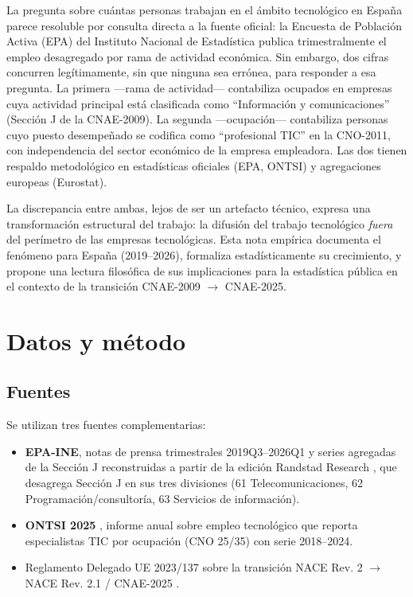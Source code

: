 \documentclass[11pt,a4paper]{article}
\begin{document}
La pregunta sobre cuántas personas trabajan en el ámbito tecnológico en España
parece resoluble por consulta directa a la fuente oficial: la Encuesta de
Población Activa (EPA) del Instituto Nacional de Estadística publica
trimestralmente el empleo desagregado por rama de actividad económica. Sin
embargo, dos cifras concurren legítimamente, sin que ninguna sea errónea, para
responder a esa pregunta. La primera ---rama de actividad--- contabiliza
ocupados en empresas cuya actividad principal está clasificada como
``Información y comunicaciones'' (Sección J de la CNAE-2009). La segunda
---ocupación--- contabiliza personas cuyo puesto desempeñado se codifica
como ``profesional TIC'' en la CNO-2011, con independencia del sector económico
de la empresa empleadora. Las dos tienen respaldo metodológico en estadísticas
oficiales (EPA, ONTSI) y agregaciones europeas (Eurostat).

La discrepancia entre ambas, lejos de ser un artefacto técnico, expresa una
transformación estructural del trabajo: la difusión del trabajo tecnológico
\emph{fuera} del perímetro de las empresas tecnológicas. Esta nota empírica
documenta el fenómeno para España (2019--2026), formaliza estadísticamente su
crecimiento, y propone una lectura filosófica de sus implicaciones para la
estadística pública en el contexto de la transición CNAE-2009 $\rightarrow$
CNAE-2025.

\section{Datos y método}

\subsection{Fuentes}

Se utilizan tres fuentes complementarias:
\begin{itemize}
\item \textbf{EPA-INE}, notas de prensa trimestrales 2019Q3--2026Q1 y series
  agregadas de la Sección J reconstruidas a partir de la edición Randstad
  Research \citep{randstad2026}, que desagrega Sección J en sus tres divisiones
  (61 Telecomunicaciones, 62 Programación/consultoría, 63 Servicios de
  información).
\item \textbf{ONTSI 2025} \citep{ontsi2025}, informe anual sobre empleo
  tecnológico que reporta especialistas TIC por ocupación (CNO 25/35) con serie
  2018--2024.
\item Reglamento Delegado UE 2023/137 \citep{ue2023137} sobre la transición
  NACE Rev. 2 $\rightarrow$ NACE Rev. 2.1 / CNAE-2025 \citep{rd102025}.
\end{itemize}
\end{document}

